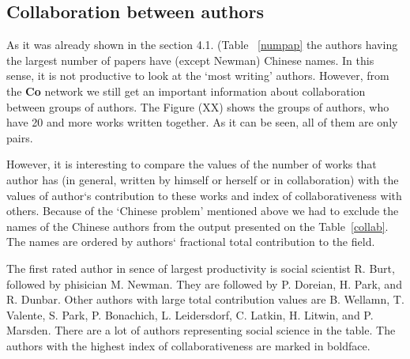 \documentclass[11pt]{article} %
\begin{document}
\subsection{Collaboration between authors}  

As it was already shown in the section 4.1. (Table~ \ref{numpap} the authors having the largest number of papers have (except Newman) Chinese names. In this sense, it is not productive to look at the `most writing' authors. However, from the \textbf{Co} network we still get an important information about collaboration between groups of authors. The Figure (XX) shows the groups of authors, who have 20 and more works written together. As it can be seen, all of them are only pairs. 


 However, it is interesting to compare the values of the number of works that author has (in general, written by himself or herself or in collaboration) with the values of author`s contribution to these works and index of collaborativeness with others. Because of the `Chinese problem'  mentioned above we had to exclude the names of the Chinese authors from the output presented on the Table~\ref{collab}.  The names are ordered by authors` fractional total contribution to the field.\medskip  
 
 The first rated author in sence of largest productivity is social scientist R. Burt, followed by phisician M. Newman. They are followed by P. Doreian, H. Park, and R. Dunbar. Other authors with large total contribution values are B. Wellamn, T. Valente, S. Park, P. Bonachich, L. Leidersdorf, C. Latkin, H. Litwin, and P. Marsden. There are a lot of authors representing social science in the table. The authors with the highest index of collaborativeness are marked in boldface. \medskip 
\end{document}
